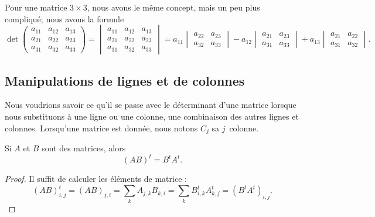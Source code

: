 Pour une matrice \( 3\times 3\), nous avons le même concept, mais un peu plus compliqué; nous avons la formule
\begin{equation}
	\det
	\begin{pmatrix}
		a_{11} & a_{12} & a_{13} \\
		a_{21} & a_{22} & a_{23} \\
		a_{31} & a_{32} & a_{33}
	\end{pmatrix}
	=
	\begin{vmatrix}
		a_{11} & a_{12} & a_{13} \\
		a_{21} & a_{22} & a_{23} \\
		a_{31} & a_{32} & a_{33}
	\end{vmatrix}=
	a_{11}\begin{vmatrix}
		a_{22} & a_{23} \\
		a_{32} & a_{33}
	\end{vmatrix}-
	a_{12}\begin{vmatrix}
		a_{21} & a_{23} \\
		a_{31} & a_{33}
	\end{vmatrix}+
	a_{13}\begin{vmatrix}
		a_{21} & a_{22} \\
		a_{31} & a_{32}
	\end{vmatrix}.
\end{equation}

\subsection{Manipulations de lignes et de colonnes}

Nous voudrions savoir ce qu'il se passe avec le déterminant d'une matrice lorsque nous substituons à une ligne ou une colonne, une combinaison des autres lignes et colonnes. Lorsqu'une matrice est donnée, nous notons \( C_j\) sa \( j\)\ieme\ colonne.

\begin{lemma}        \label{LEMooRSJTooQEoOtN}
	Si \( A\) et \( B\) sont des matrices, alors
	\begin{equation}
		(AB)^t=B^tA^t.
	\end{equation}
\end{lemma}

\begin{proof}
	Il suffit de calculer les éléments de matrice :
	\begin{equation}
		(AB)^t_{i,j}=(AB)_{j,i}=\sum_k A_{j,k}B_{k,i}=\sum_k B^t_{i,k}A^t_{k,j}=(B^tA^t)_{i,j}.
	\end{equation}
\end{proof}

